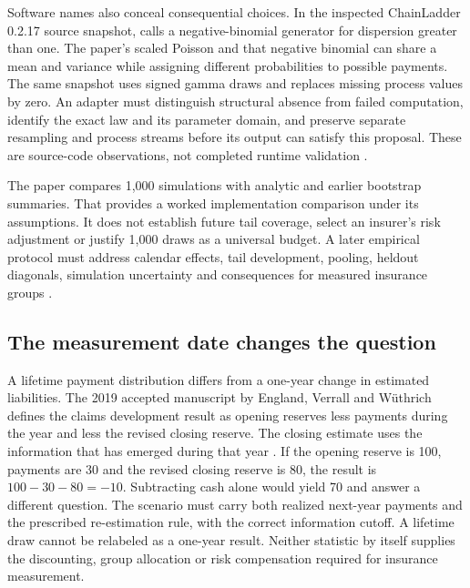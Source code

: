 Software names also conceal consequential choices. In the inspected
ChainLadder 0.2.17 source snapshot,  calls a negative-binomial
generator for dispersion greater than one. The paper's scaled Poisson
and that negative binomial can share a mean and variance while assigning
different probabilities to possible payments. The same snapshot uses
signed gamma draws and replaces missing process values by zero. An adapter
must distinguish structural absence from failed computation, identify the
exact law and its parameter domain, and preserve separate resampling and
process streams before its output can satisfy this proposal. These are
source-code observations, not completed runtime validation
\citep{chainladder2023snapshot}.

The paper compares 1,000 simulations with analytic and earlier bootstrap
summaries. That provides a worked implementation comparison under its
assumptions. It does not establish future tail coverage, select an insurer's
risk adjustment or justify 1,000 draws as a universal budget. A later
empirical protocol must address calendar effects, tail development, pooling,
heldout diagonals, simulation uncertainty and consequences for measured
insurance groups \citep[Section 4, Tables 1--3 and Figure 1]{england2001addendum}.

\subsection{The measurement date changes the question}

A lifetime payment distribution differs from a one-year change in
estimated liabilities. The 2019 accepted manuscript by England, Verrall
and W\"uthrich defines the claims development result as opening reserves
less payments during the year and less the revised closing reserve. The
closing estimate uses the information that has emerged during that year
\citep[equations 5--7 and Section 3.2]{england2019lifetime}.
If the opening reserve is 100, payments are 30 and the revised closing
reserve is 80, the result is $100-30-80=-10$. Subtracting cash alone
would yield 70 and answer a different question. The scenario must carry
both realized next-year payments and the prescribed re-estimation rule,
with the correct information cutoff. A lifetime draw cannot be relabeled
as a one-year result. Neither statistic by itself supplies the discounting,
group allocation or risk compensation required for insurance measurement.
